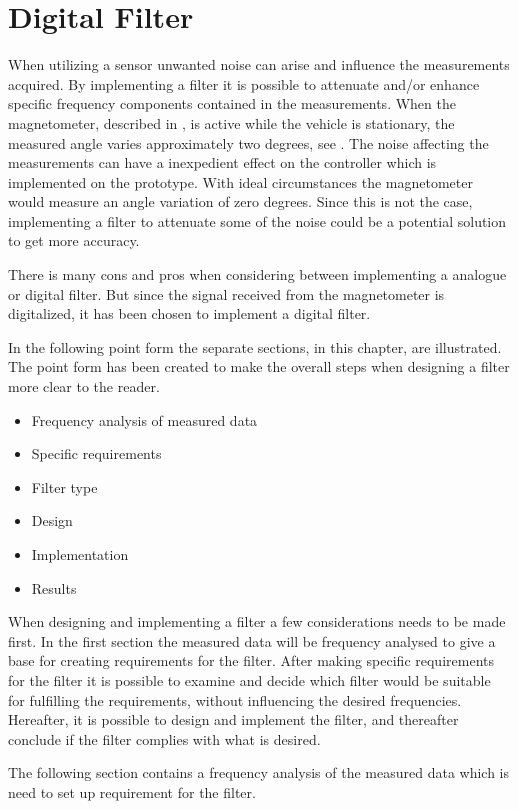 \chapter{Digital Filter}
When utilizing a sensor unwanted noise can arise and influence the measurements acquired. By implementing a filter it is possible to attenuate and/or enhance specific frequency components contained in the measurements. When the magnetometer, described in , is active while the vehicle is stationary, the measured angle varies approximately two degrees, see . The noise affecting the measurements can have a inexpedient effect on the controller which is implemented on the prototype. With ideal circumstances the magnetometer would measure an angle variation of zero degrees. Since this is not the case, implementing a filter to attenuate some of the noise could be a potential solution to get more accuracy.

There is many cons and pros when considering between implementing a analogue or digital filter. But since the signal received from the magnetometer is digitalized, it has been chosen to implement a digital filter.

In the following point form the separate sections, in this chapter, are illustrated. The point form has been created to make the overall steps when designing a filter more clear to the reader.

\begin{itemize}
\item Frequency analysis of measured data
\item Specific requirements
\item Filter type
\item Design
\item Implementation
\item Results
\end{itemize}

When designing and implementing a filter a few considerations needs to be made first. In the first section the measured data will be frequency analysed to give a base for creating requirements for the filter. After making specific requirements for the filter it is possible to examine and decide which filter would be suitable for fulfilling the requirements, without influencing the desired frequencies. Hereafter, it is possible to design and implement the filter, and thereafter conclude if the filter complies with what is desired.

The following section contains a frequency analysis of the measured data which is need to set up requirement for the filter.

